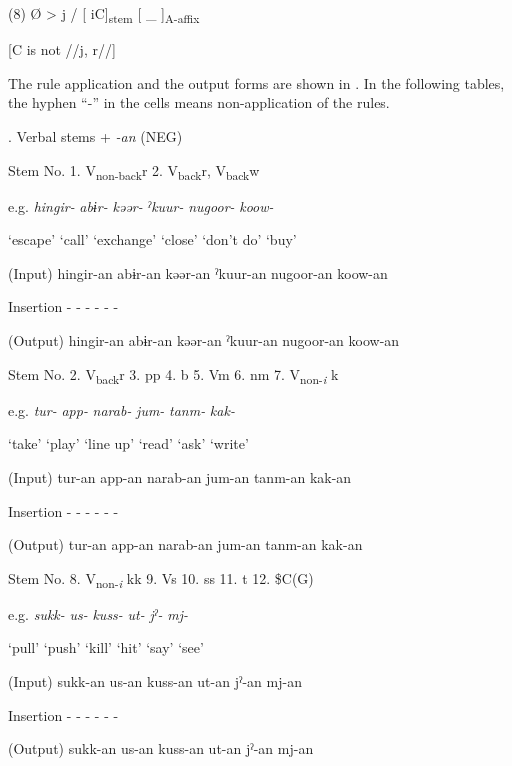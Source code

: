 (8)  Ø  >  j  /  [   iC]\textsubscript{stem}  [ \_   ]\textsubscript{A-affix}

          [C is not //j, r//]  

The rule application and the output forms are shown in . In the following tables, the hyphen “-” in the cells means non-application of the rules.

\begin{styleBeschriftung}
\textmd{}\textmd{. Verbal stems +} \textmd{\textit{{}-an}}\textmd{ (NEG)}
\end{styleBeschriftung}

Stem No.  1. V\textsubscript{non-back}r  2. V\textsubscript{back}r, V\textsubscript{back}w

e.g.  \textit{hingir-}  \textit{abɨr-}  \textit{kəər-}  \textit{ˀkuur-}  \textit{nugoor-}  \textit{koow-}

  ‘escape’  ‘call’  ‘exchange’  ‘close’  ‘don’t do’  ‘buy’

(Input)  hingir-an  abɨr-an  kəər-an  ˀkuur-an  nugoor-an  koow-an

Insertion  {}-  {}-  {}-  {}-  {}-  {}-

(Output)  hingir-an  abɨr-an  kəər-an  ˀkuur-an  nugoor-an  koow-an

Stem No.  2. V\textsubscript{back}r  3. pp  4. b  5. Vm  6. nm  7. V\textsubscript{non-}\textit{\textsubscript{i} }k

e.g.  \textit{tur-}  \textit{app-}  \textit{narab-}  \textit{jum-}  \textit{tanm-}  \textit{kak-}

  ‘take’  ‘play’  ‘line up’  ‘read’  ‘ask’  ‘write’

(Input)  tur-an  app-an  narab-an  jum-an  tanm-an  kak-an

Insertion  {}-  {}-  {}-  {}-  {}-  {}-

(Output)  tur-an  app-an  narab-an  jum-an  tanm-an  kak-an

Stem No.  8. V\textsubscript{non-}\textit{\textsubscript{i} }kk  9. Vs  10. ss  11. t  12. \$C(G)

e.g.  \textit{sukk-}  \textit{us-}  \textit{kuss-}  \textit{ut-}  \textit{jˀ-}  \textit{mj-}

  ‘pull’  ‘push’  ‘kill’  ‘hit’  ‘say’  ‘see’

(Input)  sukk-an  us-an  kuss-an  ut-an  jˀ-an  mj-an

Insertion  {}-  {}-  {}-  {}-  {}-  {}-

(Output)  sukk-an  us-an  kuss-an  ut-an  jˀ-an  mj-an

